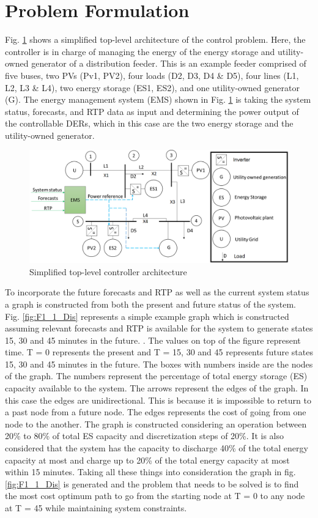 \section{Problem Formulation} \label{sec:problem_formulation}
Fig. \ref{fig:controller-setup} shows a simplified top-level architecture of the control problem. Here, the controller is in charge of managing the energy of the energy storage and utility-owned generator of a distribution feeder. This is an example feeder comprised of five buses, two PVs (Pv1, PV2), four loads (D2, D3, D4 \& D5), four lines (L1, L2, L3 \& L4),  two energy storage (ES1, ES2), and one utility-owned generator (G). The energy management system  (EMS) shown in  Fig. \ref{fig:controller-setup} is taking the system status, forecasts, and RTP data as input and determining the power output of the controllable DERs, which in this case are the two energy storage and the utility-owned generator.

\begin{figure}
\centering
\includegraphics[width = \linewidth]{figs/A82/controller_setup2.png}
\caption{Simplified top-level controller architecture}
\label{fig:controller-setup}
\end{figure}

To incorporate the future forecasts and RTP as well as the current system status a graph is constructed from both the present and future status of the system. Fig. \ref{fig:F1_1_Dis} represents a simple example graph which is constructed assuming relevant forecasts and RTP is available for the system to generate states 15, 30 and 45 minutes in the future. . The values on top of the figure represent time. T = 0 represents the present and T = 15, 30 and 45 represents future states 15, 30 and 45 minutes in the future. The boxes with numbers inside are the nodes of the graph. The numbers represent the percentage of total energy storage (ES) capacity available to the system. The arrows represent the edges of the graph. In this case the edges are unidirectional. This is because it is impossible to return to a past node from a future node. The edges represents the cost of going from one node to the another. The graph is constructed considering an operation between 20\% to 80\% of total ES capacity and discretization steps of 20\%. It is also considered that the system has the capacity to discharge 40\% of the total energy capacity at most and charge up to 20\% of the total energy capacity at most within 15 minutes. Taking all these things into consideration the graph in fig. \ref{fig:F1_1_Dis} is generated and the problem that needs to be solved is to find the most cost optimum path to go from the starting node at T = 0 to any node at T = 45 while maintaining system constraints.

